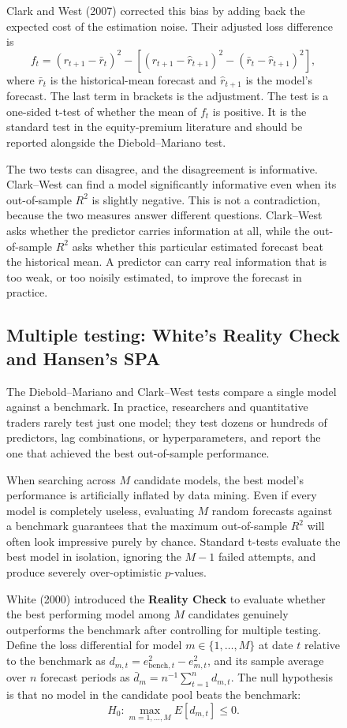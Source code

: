 \begin{figure}[htbp]
Clark and West (2007) corrected this bias by adding back the expected cost of the estimation noise. Their adjusted loss difference is
\begin{equation}
  f_t = (r_{t+1} - \bar r_t)^2 - \left[(r_{t+1} - \hat r_{t+1})^2 - (\bar r_t - \hat r_{t+1})^2\right],
  \label{eq:05-cw}
\end{equation}
where $\bar r_t$ is the historical-mean forecast and $\hat r_{t+1}$ is the model's forecast. The last term in brackets is the adjustment. The test is a one-sided t-test of whether the mean of $f_t$ is positive. It is the standard test in the equity-premium literature and should be reported alongside the Diebold--Mariano test.

The two tests can disagree, and the disagreement is informative. Clark--West can find a model significantly informative even when its out-of-sample $R^2$ is slightly negative. This is not a contradiction, because the two measures answer different questions. Clark--West asks whether the predictor carries information at all, while the out-of-sample $R^2$ asks whether this particular estimated forecast beat the historical mean. A predictor can carry real information that is too weak, or too noisily estimated, to improve the forecast in practice.

\subsection{Multiple testing: White's Reality Check and Hansen's SPA}

The Diebold--Mariano and Clark--West tests compare a single model against a benchmark. In practice, researchers and quantitative traders rarely test just one model; they test dozens or hundreds of predictors, lag combinations, or hyperparameters, and report the one that achieved the best out-of-sample performance. 

When searching across $M$ candidate models, the best model's performance is artificially inflated by data mining. Even if every model is completely useless, evaluating $M$ random forecasts against a benchmark guarantees that the maximum out-of-sample $R^2$ will often look impressive purely by chance. Standard t-tests evaluate the best model in isolation, ignoring the $M-1$ failed attempts, and produce severely over-optimistic $p$-values.

White (2000) introduced the \textbf{Reality Check} to evaluate whether the best performing model among $M$ candidates genuinely outperforms the benchmark after controlling for multiple testing. Define the loss differential for model $m \in \{1, \dots, M\}$ at date $t$ relative to the benchmark as $d_{m,t} = e^2_{\text{bench},t} - e^2_{m,t}$, and its sample average over $n$ forecast periods as $\bar{d}_m = n^{-1} \sum_{t=1}^n d_{m,t}$. The null hypothesis is that no model in the candidate pool beats the benchmark:
\begin{equation}
  H_0: \max_{m=1,\dots,M} E[d_{m,t}] \le 0.
  \label{eq:05-white-null}
\end{equation}


\end{figure}
